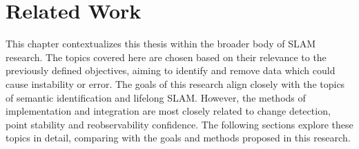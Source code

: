 \section{Related Work}
\label{sec:related_work}

This chapter contextualizes this thesis within the broader body of SLAM research. The topics covered here are chosen based on their relevance to the previously defined objectives, aiming to identify and remove data which could cause instability or error. The goals of this research align closely with the topics of semantic identification and lifelong SLAM. However, the methods of implementation and integration are most closely related to change detection, point stability and reobservability confidence. The following sections explore these topics in detail, comparing with the goals and methods proposed in this research.

% 